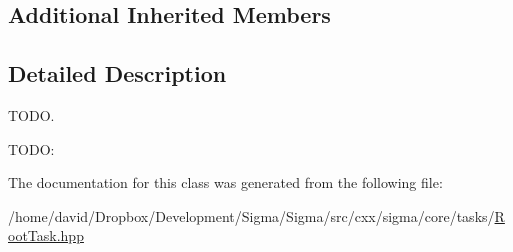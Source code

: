 \subsection*{Additional Inherited Members}


\subsection{Detailed Description}
T\-O\-D\-O. 

T\-O\-D\-O\-: 

The documentation for this class was generated from the following file\-:\begin{DoxyCompactItemize}
\item 
/home/david/\-Dropbox/\-Development/\-Sigma/\-Sigma/src/cxx/sigma/core/tasks/\hyperlink{_root_task_8hpp}{Root\-Task.\-hpp}\end{DoxyCompactItemize}
